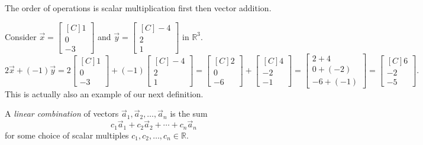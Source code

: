 The order of operations is scalar multiplication first then vector addition.

\begin{example}
Consider $\vec{x}=\begin{bmatrix*}[C]1\\ 0 \\ -3\end{bmatrix*}$ and
$\vec{y}=\begin{bmatrix*}[C]-4\\ 2 \\ 1\end{bmatrix*}$ in $\mathbb{R}^3$.
\[
2\vec{x}+(-1)\vec{y}=
2\begin{bmatrix*}[C]1\\ 0 \\ -3\end{bmatrix*}+
(-1)\begin{bmatrix*}[C]-4\\ 2 \\ 1\end{bmatrix*}=
\begin{bmatrix*}[C]2\\ 0 \\ -6\end{bmatrix*}+
\begin{bmatrix*}[C]4\\ -2 \\ -1\end{bmatrix*}=
\begin{bmatrix}2+4\\ 0+(-2) \\ -6+(-1)\end{bmatrix}=
\begin{bmatrix*}[C]6\\ -2 \\ -5\end{bmatrix*}.
\]
This is actually also an example of our next definition.
\end{example}

\begin{definition}
A \emph{linear combination} of vectors $\vec{a}_1, \vec{a}_2, \ldots,
\vec{a}_n$ is the sum
\[c_1\vec{a}_1+c_2\vec{a}_2+\cdots+c_n\vec{a}_n\]
for some choice of scalar multiples $c_1,c_2, \ldots, c_n \in \mathbb{R}$.
\end{definition}


